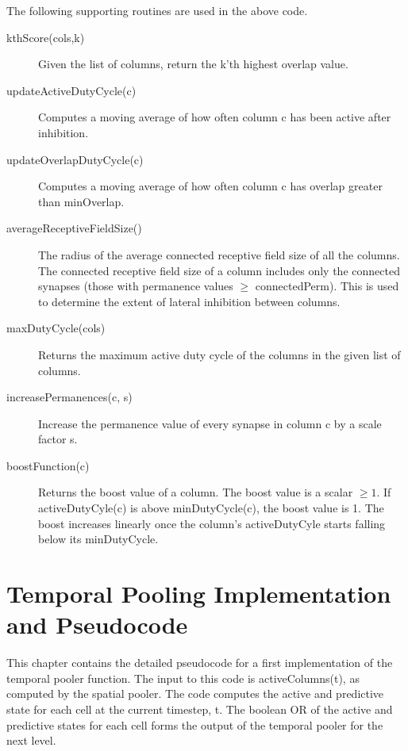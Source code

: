 \documentclass{report}
\begin{document}
The following supporting routines are used in the above code.

\begin{description}
\item[kthScore(cols,k)] Given the list of columns, return the k'th
  highest overlap value.

\item[updateActiveDutyCycle(c)] Computes a moving average of how often
  column c has been active after inhibition.

\item[updateOverlapDutyCycle(c)] Computes a moving average of how
  often column c has overlap greater than minOverlap.

\item[averageReceptiveFieldSize()] The radius of the average connected
  receptive field size of all the columns. The connected receptive
  field size of a column includes only the connected synapses (those
  with permanence values $\ge$ connectedPerm). This is used to determine
  the extent of lateral inhibition between columns.

\item[maxDutyCycle(cols)] Returns the maximum active duty cycle of the
  columns in the given list of columns.

\item[increasePermanences(c, s)] Increase the permanence value of
  every synapse in column c by a scale factor s.

\item[boostFunction(c)] Returns the boost value of a column. The boost
  value is a scalar $\ge 1$. If activeDutyCyle(c) is above
  minDutyCycle(c), the boost value is 1. The boost increases linearly
  once the column's activeDutyCyle starts falling below its
  minDutyCycle.
\end{description}

\chapter{Temporal Pooling Implementation and Pseudocode}
\label{chapter:temporal-pooling}
This chapter contains the detailed pseudocode for a first
implementation of the temporal pooler function. The input to this code
is activeColumns(t), as computed by the spatial pooler. The code
computes the active and predictive state for each cell at the current
timestep, t. The boolean OR of the active and predictive states for
each cell forms the output of the temporal pooler for the next level.
\end{document}
